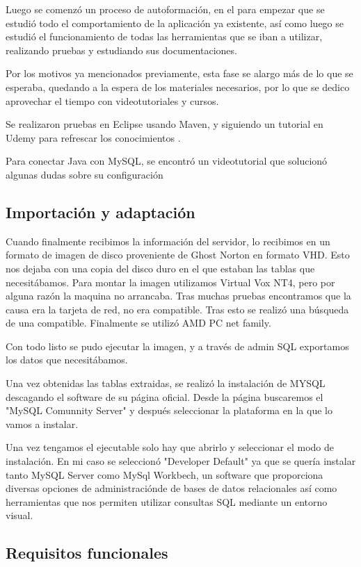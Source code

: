 Luego se comenzó un proceso de autoformación, en el para empezar que se estudió todo el comportamiento de la aplicación ya existente, así como luego se estudió el funcionamiento de todas las herramientas que se iban a utilizar, realizando pruebas y estudiando sus documentaciones.

Por los motivos ya mencionados previamente, esta fase se alargo más de lo que se esperaba, quedando a la espera de los materiales necesarios, por lo que se dedico aprovechar el tiempo con videotutoriales y cursos.


Se realizaron pruebas en Eclipse usando Maven, y siguiendo un tutorial en Udemy para refrescar los conocimientos \cite{curso:JSPin25Steps}.

Para conectar Java con MySQL, se encontró un videotutorial que solucionó algunas dudas sobre su configuración \cite{tutorial:javaMySQL}


\subsection{Importación y adaptación}

Cuando finalmente recibimos la información del servidor, lo recibimos en un formato de imagen de disco proveniente de Ghost Norton en formato VHD. Esto nos dejaba con una copia del disco duro en el que estaban las tablas que necesitábamos.
Para montar la imagen utilizamos Virtual Vox NT4, pero por alguna razón la maquina no arrancaba. Tras muchas pruebas encontramos que la causa era la tarjeta de red, no era compatible. Tras esto se realizó una búsqueda de una compatible. Finalmente se utilizó AMD PC net family. 

Con todo listo se pudo ejecutar la imagen, y a través de admin SQL exportamos los datos que necesitábamos.

Una vez obtenidas las tablas extraidas, se realizó la instalación de MYSQL descagando el software de su página oficial. Desde la página buscaremos el "MySQL Comunnity Server" y después seleccionar la plataforma en la que lo vamos a instalar.

Una vez tengamos el ejecutable solo hay que abrirlo y seleccionar el modo de instalación. En mi caso se seleccionó "Developer Default" ya que se quería instalar tanto MySQL Server como MySql Workbech, un software que proporciona diversas opciones de administraciónde de bases de datos relacionales así como herramientas que nos permiten utilizar consultas SQL mediante un entorno visual.

\subsection{Requisitos funcionales}

